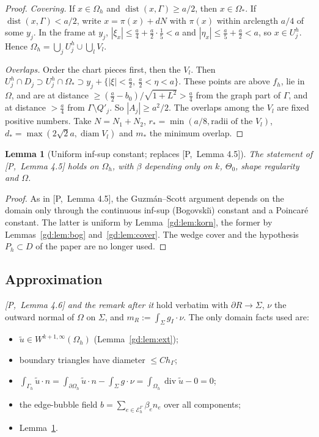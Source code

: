 \documentclass[11pt,reqno]{amsart}
\theoremstyle{plain}
\newtheorem{lemma}[theorem]{Lemma}
\theoremstyle{definition}
\newcommand{\hG}{h_\Gamma}
\newcommand{\Gh}{\Gamma_h}
\newcommand{\Oh}{\Omega_h}
\newcommand{\EG}{\mathcal E_h^\Gamma}
\newcommand{\gI}{g_I}
\newcommand{\ut}{\tilde u}
\renewcommand{\div}{\operatorname{div}}
\DeclareMathOperator{\diam}{diam}
\DeclareMathOperator{\dist}{dist}
\newcommand{\Pref}[1]{\textup{[P,~#1]}}
\begin{document}
\begin{proof}
\emph{Covering.} If $x\in\Oh$ and $\dist(x,\Gamma)\ge a/2$, then $x\in\Omega_\ast$. If $\dist(x,\Gamma)<a/2$, write $x=\pi(x)+dN$ with $\pi(x)$ within arclength $a/4$ of some $y_j$. In the frame at $y_j$, $|\xi_x|\le\frac a4+\frac a2\cdot\frac15<a$ and $|\eta_x|\le\frac a5+\frac a2<a$, so $x\in U_j^h$. Hence $\Oh=\bigcup_jU_j^h\cup\bigcup_lV_l$.

\emph{Overlaps.} Order the chart pieces first, then the $V_l$. Then $U_j^h\cap D_j\supset U_j^h\cap\Omega_\ast\supset y_j+\{|\xi|<\frac a2,\ \frac a2<\eta<a\}$. These points are above $f_h$, lie in $\Omega$, and are at distance $\ge(\frac a2-b_0)/\sqrt{1+L^2}>\frac a4$ from the graph part of $\Gamma$, and at distance $>\frac a4$ from $\Gamma\setminus Q'_j$. So $|A_j|\ge a^2/2$. The overlaps among the $V_l$ are fixed positive numbers. Take $N=N_1+N_2$, $r_\ast=\min(a/8,\text{radii of the }V_l)$, $d_\ast=\max(2\sqrt2a,\diam V_l)$ and $m_\ast$ the minimum overlap.
\end{proof}

\begin{lemma}[Uniform inf-sup constant; replaces \Pref{Lemma 4.5}]\label{gd:lem:infsup}
The statement of \Pref{Lemma 4.5} holds on $\Oh$, with $\beta$ depending only on $k$, $\Theta_0$, shape regularity and $\Omega$.
\end{lemma}

\begin{proof}
As in \Pref{Lemma 4.5}, the Guzm\'an--Scott argument \cite{GuzmanScott2019} depends on the domain only through the continuous inf-sup (Bogovski\u{\i}) constant and a Poincar\'e constant. The latter is uniform by Lemma~\ref{gd:lem:korn}, the former by Lemmas~\ref{gd:lem:bog} and~\ref{gd:lem:cover}. The wedge cover and the hypothesis $P_h\subset D$ of the paper are no longer used.
\end{proof}

\subsection{Approximation}
\emph{\Pref{Lemma 4.6} and the remark after it} hold verbatim with $\partial R\to\Sigma$, $\nu$ the outward normal of $\Omega$ on $\Sigma$, and $m_R:=\int_\Sigma\gI\cdot\nu$. The only domain facts used are:
\begin{itemize}
\item $\ut\in W^{k+1,\infty}(\Oh)$ (Lemma~\ref{gd:lem:ext});
\item boundary triangles have diameter $\le C\hG$;
\item $\int_{\Gh}\ut\cdot n=\int_{\partial\Oh}\ut\cdot n-\int_\Sigma g\cdot\nu=\int_{\Oh}\div\ut-0=0$;
\item the edge-bubble field $b=\sum_{e\in\EG}\beta_en_e$ over all components;
\item Lemma~\ref{gd:lem:infsup}.
\end{itemize}
\end{document}

